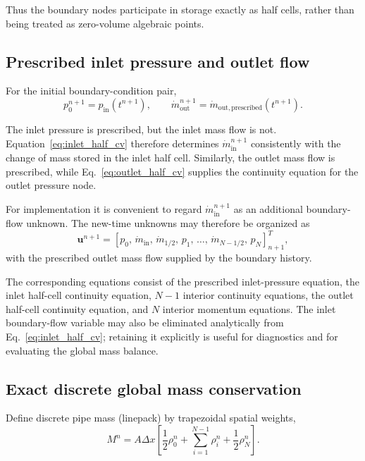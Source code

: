 \documentclass[11pt]{article}
\newcommand{\mdot}{\dot m}
\begin{document}
Thus the boundary nodes participate in storage exactly as half cells,
rather than being treated as zero-volume algebraic points.

\subsection{Prescribed inlet pressure and outlet flow}

For the initial boundary-condition pair,
\begin{equation}
p_0^{n+1}=p_{\mathrm{in}}(t^{n+1}),
\qquad
\mdot_{\mathrm{out}}^{n+1}
=
\mdot_{\mathrm{out,prescribed}}(t^{n+1}).
\label{eq:prescribed_bc}
\end{equation}

The inlet pressure is prescribed, but the inlet mass flow is not.
Equation~\eqref{eq:inlet_half_cv} therefore determines
$\mdot_{\mathrm{in}}^{n+1}$ consistently with the change of mass stored
in the inlet half cell.  Similarly, the outlet mass flow is prescribed,
while Eq.~\eqref{eq:outlet_half_cv} supplies the continuity equation for
the outlet pressure node.

For implementation it is convenient to regard
$\mdot_{\mathrm{in}}^{n+1}$ as an additional boundary-flow unknown.
The new-time unknowns may therefore be organized as
\begin{equation}
\bm u^{n+1}
=
\left[
p_0,\,
\mdot_{\mathrm{in}},\,
\mdot_{1/2},\,
p_1,\,
\ldots,\,
\mdot_{N-1/2},\,
p_N
\right]^{T}_{n+1},
\end{equation}
with the prescribed outlet mass flow supplied by the boundary history.

The corresponding equations consist of the prescribed inlet-pressure
equation, the inlet half-cell continuity equation, $N-1$ interior
continuity equations, the outlet half-cell continuity equation, and
$N$ interior momentum equations.  The inlet boundary-flow variable may
also be eliminated analytically from Eq.~\eqref{eq:inlet_half_cv};
retaining it explicitly is useful for diagnostics and for evaluating
the global mass balance.

\subsection{Exact discrete global mass conservation}

Define discrete pipe mass (linepack) by trapezoidal spatial weights,
\begin{equation}
M^n
=
A\Delta x
\left[
\frac12\rho_0^n
+
\sum_{i=1}^{N-1}\rho_i^n
+
\frac12\rho_N^n
\right].
\label{eq:linepack}
\end{equation}
\end{document}
